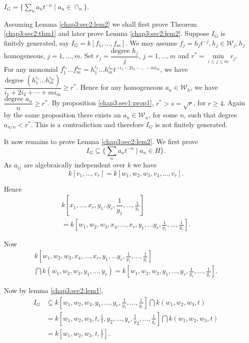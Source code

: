 \begin{lem}\label{chap3:sec2:lem2}%
 $ I_G = \bigg\{\underset{n}{\sum}a_n t^{-n} \mid a_n \in \sqcap_n
  \bigg\}$.

Assuming Lemma \ref{chap3:sec2:lem2} we shall first prove Theorem
\ref{chap3:sec2:thm1} 
and later prove Lemma \ref{chap3:sec2:lem2}. Suppose $ I_G$ is
finitely generated, say $ I_G = k[f_1, 
 \dots , f_m]$. We may assume $ f_j = h_j t^{-j} , h_j \in \mathcal
{W}_j , h_j$ homogeneous, $ j=1, \dots , m$. Set $ r_j =
\dfrac{\text{degree } h_j}{j}$, $j = 1, \dots , m$ and $ r^* = \underset{i\le
  j\le m}{\min} 
r_j$. For any monomial $ f_{1}^{i_1} \dots f_{m}^{i_m}=
h_{1}^{i_1}\dots h_{m}^{i_m} t^{-i_1 - 2i_2 - \dots - mi_m}$, we have
$ \dfrac{\text{degree } (h_{1}^{i_1}\dots h_{m}^{i_m})}{i_1 + 2i_2 +
 \cdots + mi_m} \ge r^*$. Hence for any homogeneous $ a_n \in
\mathcal{W}_h$, we have $ \dfrac{\text{degree } a_n}{n} \ge r^*$. By
proposition \ref{chap3:sec1:prop1}, $r^* > s = \sqrt{r}$, for $ r \ge 4$. Again by
the same proposition there exists an $a_n \in \mathcal{W}_n$, for some $n$,
such that degree $ a_{n/n} <  r^*$. This is a contradiction and
therefore $ I_G$ is not finitely generated. 
\end{lem}

It now remains to prove Lemma \ref{chap3:sec2:lem2}. We first prove
\begin{equation*}
I_G \subseteq \bigg\{ \underset{n}{\sum} a_n t^{-n} \mid
a_n  \in H \bigg\}. \tag*{($\ast$)} 
\end{equation*}
As $ a_{ij}$ are algebraically independent over $k$ we have 
$$
k [v_1, \dots , v_r] = k[w_1, w_2, w_3, v_4, \dots , v_r].
$$ 

Hence 
\begin{multline*}
 k \left[x_1, \dots, x_r , y_1 . . y_r , \dfrac{1}{y_1}, \dots ,
  \frac{1}{y_r}\right]\\ 
 = k \left[ w_1, w_2, w_3, x_4, \dots , x_r, y_1,
  \dots y_r, \frac{1}{y_1}, \dots , \frac{1}{y_r} \right].
\end{multline*}

Now 
\begin{multline*}
 k \left[ w_1, w_2, w_3, x_4, \dots , x_r, y_1, \dots y_r ,
  \frac{1}{y_1}, \dots , \frac{1}{y_r} \right]\\ 
 \bigcap k(w_1, w_2, w_3, y_1, \dots , y_r) 
 = k \left[ w_1, w_2, w_3, y_1, \dots , y_r,
  \frac{1}{y_1}, \dots , \frac{1}{y_r} \right].
\end{multline*}

 Now by lemma \ref{chap3:sec2:lem1}, 
\begin{align*} 
 I_G & \subseteq k \left[ w_1, w_2, w_3, y_1, \dots , y_r,
  \frac{1}{y_1}, \dots , \frac{1}{y_r} \right] 
 \bigcap k(w_1, w_2, w_3, t)\\  
 & = k \left[ w_1, w_2, w_3, t, \frac{1}{t}, y_2 , \dots , y_r, \frac{1}{y}_2
 , \dots , \frac{1}{y_r} \right] \bigcap k(w_1, w_2, w_3,t)\\ 
 & = k \left[ w_1,
 w_2, w_3, t, \frac{1}{t} \right]. 
\end{align*}\pageoriginale

